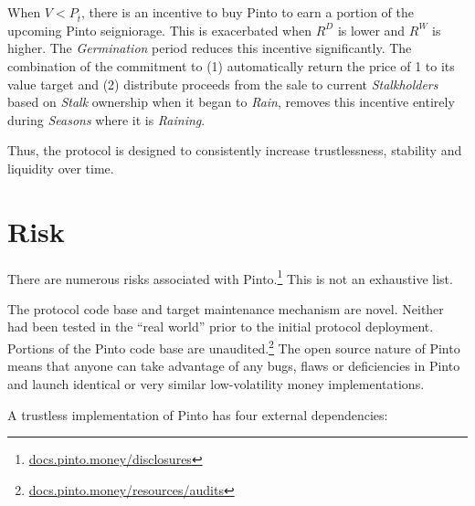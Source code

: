 \documentclass[tikz]{article}
\newcommand{\term}[1]{\textsl{#1}}
\newcommand{\fref}[1]{\footnote{\href{http://#1}{#1}}}
\newcommand{\Pinto}{} %
\renewcommand{\Pinto}{\usebox{\cachePinto}}
\begin{document}
When $V < P_{\overline{t}}$, there is an incentive to buy Pinto to earn a portion of the upcoming Pinto seigniorage. This is exacerbated when $R^{D}$ is lower and $R^{W}$ is higher. The \term{Germination} period reduces this incentive significantly. The combination of the commitment to (1) automatically return the price of \Pinto1 to its value target and (2) distribute proceeds from the sale to current \term{Stalkholders} based on \term{Stalk} ownership when it began to \term{Rain}, removes this incentive entirely during \term{Seasons} where it is \term{Raining}.

\vspace{-0.15cm}

Thus, the protocol is designed to consistently increase trustlessness, stability and liquidity over time.


\vspace{-0.15cm}
\section{Risk}
\vspace{-0.15cm}

There are numerous risks associated with Pinto.\fref{docs.pinto.money/disclosures} This is not an exhaustive list.

\vspace{-0.15cm}

The protocol code base and target maintenance mechanism are novel. Neither had been tested in the “real world” prior to the initial protocol deployment. Portions of the Pinto code base are unaudited.\footnote{\href{https://docs.pinto.money/resources/audits}{docs.pinto.money/resources/audits}} The open source nature of Pinto means that anyone can take advantage of any bugs, flaws or deficiencies in Pinto and launch identical or very similar low-volatility money implementations.

\vspace{-0.15cm}

A trustless implementation of Pinto has four external dependencies:
\end{document}

